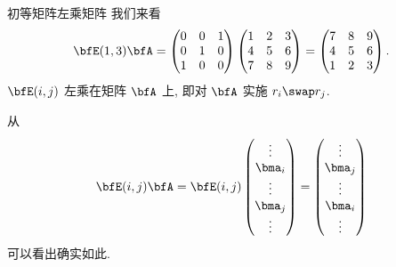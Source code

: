 \begin{frame}{初等矩阵左乘矩阵}
	\onslide<+->
	我们来看
	\[\bfE(1,3)\bfA=\begin{pmatrix}
		0&0&1\\
		0&1&0\\
		1&0&0
	\end{pmatrix}\begin{pmatrix}
		1&2&3\\
		4&5&6\\
		7&8&9
	\end{pmatrix}=\begin{pmatrix}
		7&8&9\\
		4&5&6\\
		1&2&3
	\end{pmatrix}.\]
	\onslide<+->
	$\bfE(i,j)$ 左乘在矩阵 $\bfA$ 上, 即对 $\bfA$ 实施 $r_i\swap r_j$.

	\onslide<+->
	从
	\[\bfE(i,j)\bfA=\bfE(i,j)\begin{pmatrix}
		\vdots\\
		\bma_i\\
		\vdots\\
		\bma_j\\
		\vdots
	\end{pmatrix}=\begin{pmatrix}
		\vdots\\
		\bma_j\\
		\vdots\\
		\bma_i\\
		\vdots
	\end{pmatrix}\]
	可以看出确实如此.
\end{frame}


